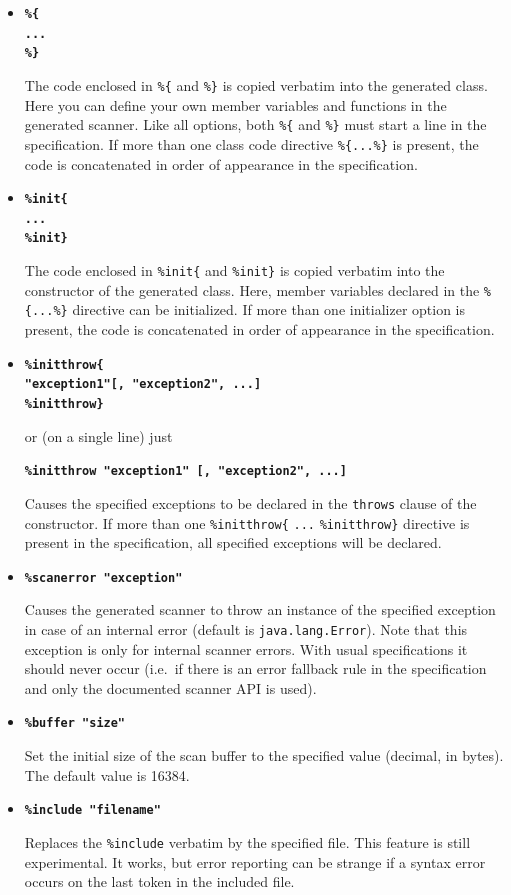 \documentclass[11pt]{scrartcl}
\begin{document}
\begin{itemize}
\item
{\bf \verb+%{+}\\ {\bf \texttt{...}}\\ {\bf \verb+%}+}

The code enclosed in \verb+%{+ and \verb+%}+ is copied verbatim
into the generated class. Here you can define your own member variables
and functions in the generated scanner. Like all options, both \verb+%{+
and \verb+%}+ must start a line in the specification. If more than one
class code directive \verb+%{...%}+ is present, the code is concatenated
in order of appearance in the specification.
 
\item
{\bf \verb+%init{+}\\
{\bf \texttt{...}}\\
{\bf \verb+%init}+}

The code enclosed in \verb+%init{+ and \verb+%init}+ is copied
verbatim into the constructor of the generated class. Here, member
variables declared in the \verb+%{...%}+ directive can be initialized.
If more than one initializer option is present, the code is concatenated
in order of appearance in the specification.
 
\item
{\bf \verb+%initthrow{+}\\
{\bf \texttt{"exception1"[, "exception2", ...]}}\\
{\bf \verb+%initthrow}+}

or (on a single line) just

{\bf \texttt{\%initthrow "exception1" [,  "exception2", ...]}}

Causes the specified exceptions to be declared in the \texttt{throws}
clause of the constructor. If more than one \verb+%initthrow{+ \texttt{...} \verb+%initthrow}+
directive is present in the specification, all specified exceptions will
be declared.

\item 
{\bf \texttt{\%scanerror "exception"}}

Causes the generated scanner to throw an instance of the specified
exception in case of an internal error (default is
\texttt{java.lang.Error}).  Note that this exception is only for
internal scanner errors. With usual specifications it should never
occur (i.e.~if there is an error fallback rule in the specification
and only the documented scanner API is used).

\item
{\bf \texttt{\%buffer "size"}}

Set the initial size of the scan buffer to the specified value 
(decimal, in bytes). The default value is 16384.

\item 
{\bf \texttt{\%include "filename"}}

Replaces the \texttt{\%include} verbatim by the specified file. This
feature is still experimental. It works, but error reporting can be
strange if a syntax error occurs on the last token in the included
file.

\end{itemize}
\end{document}
